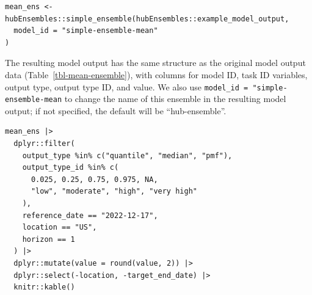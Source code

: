 \documentclass[
  article,
  shortnames,
  notitle]{jss}
\begin{document}
\begin{verbatim}
mean_ens <- hubEnsembles::simple_ensemble(hubEnsembles::example_model_output,
  model_id = "simple-ensemble-mean"
)
\end{verbatim}

The resulting model output has the same structure as the original model
output data (Table~\ref{tbl-mean-ensemble}), with columns for model ID,
task ID variables, output type, output type ID, and value. We also use
\texttt{model\_id\ =\ "simple-ensemble-mean} to change the name of this
ensemble in the resulting model output; if not specified, the default
will be ``hub-ensemble''.

\begin{verbatim}
mean_ens |>
  dplyr::filter(
    output_type %in% c("quantile", "median", "pmf"),
    output_type_id %in% c(
      0.025, 0.25, 0.75, 0.975, NA,
      "low", "moderate", "high", "very high"
    ),
    reference_date == "2022-12-17",
    location == "US",
    horizon == 1
  ) |>
  dplyr::mutate(value = round(value, 2)) |>
  dplyr::select(-location, -target_end_date) |>
  knitr::kable()
\end{verbatim}
\end{document}
